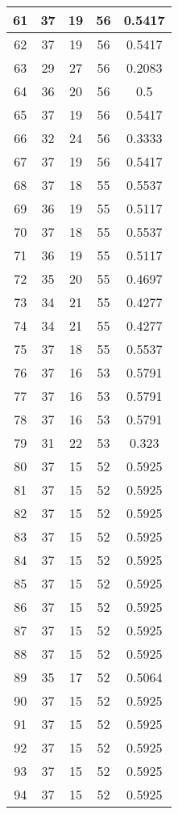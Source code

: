 \documentclass[letterpaper, 12pt]{article}
\begin{document}
\begin{longtable}{|c|c|c|c|c|}
\hline
61 & 37 & 19 & 56 & 0.5417 \\
\hline
62 & 37 & 19 & 56 & 0.5417 \\
\hline
63 & 29 & 27 & 56 & 0.2083 \\
\hline
64 & 36 & 20 & 56 & 0.5 \\
\hline
65 & 37 & 19 & 56 & 0.5417 \\
\hline
66 & 32 & 24 & 56 & 0.3333 \\
\hline
67 & 37 & 19 & 56 & 0.5417 \\
\hline
68 & 37 & 18 & 55 & 0.5537 \\
\hline
69 & 36 & 19 & 55 & 0.5117 \\
\hline
70 & 37 & 18 & 55 & 0.5537 \\
\hline
71 & 36 & 19 & 55 & 0.5117 \\
\hline
72 & 35 & 20 & 55 & 0.4697 \\
\hline
73 & 34 & 21 & 55 & 0.4277 \\
\hline
74 & 34 & 21 & 55 & 0.4277 \\
\hline
75 & 37 & 18 & 55 & 0.5537 \\
\hline
76 & 37 & 16 & 53 & 0.5791 \\
\hline
77 & 37 & 16 & 53 & 0.5791 \\
\hline
78 & 37 & 16 & 53 & 0.5791 \\
\hline
79 & 31 & 22 & 53 & 0.323 \\
\hline
80 & 37 & 15 & 52 & 0.5925 \\
\hline
81 & 37 & 15 & 52 & 0.5925 \\
\hline
82 & 37 & 15 & 52 & 0.5925 \\
\hline
83 & 37 & 15 & 52 & 0.5925 \\
\hline
84 & 37 & 15 & 52 & 0.5925 \\
\hline
85 & 37 & 15 & 52 & 0.5925 \\
\hline
86 & 37 & 15 & 52 & 0.5925 \\
\hline
87 & 37 & 15 & 52 & 0.5925 \\
\hline
88 & 37 & 15 & 52 & 0.5925 \\
\hline
89 & 35 & 17 & 52 & 0.5064 \\
\hline
90 & 37 & 15 & 52 & 0.5925 \\
\hline
91 & 37 & 15 & 52 & 0.5925 \\
\hline
92 & 37 & 15 & 52 & 0.5925 \\
\hline
93 & 37 & 15 & 52 & 0.5925 \\
\hline
94 & 37 & 15 & 52 & 0.5925 \\

\end{longtable}
\end{document}

